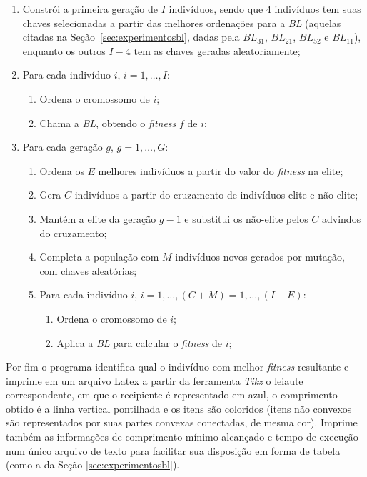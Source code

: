 \documentclass[12pt, openright, twoside, a4paper, english, brazilian]{USPSC-classe/USPSC}
\begin{document}
\begin{enumerate}
    \item Constrói a primeira geração de $I$ indivíduos, sendo que $4$ indivíduos tem suas chaves selecionadas a partir das melhores ordenações para a {\it BL} (aquelas citadas na Seção~\ref{sec:experimentosbl}, dadas pela $BL_{31}$, $BL_{21}$, $BL_{52}$ e $BL_{11}$), enquanto os outros $I-4$ tem as chaves geradas aleatoriamente;
    \item Para cada indivíduo $i$, $i = 1, \dots, I$:
    \begin{enumerate}
        \item Ordena o cromossomo de $i$;
        \item Chama a {\it BL}, obtendo o {\it fitness} $f$ de $i$;
    \end{enumerate}
    \item Para cada geração $g$, $g = 1, \dots, G$:
    \begin{enumerate}
        \item Ordena os $E$ melhores indivíduos a partir do valor do {\it fitness} na elite;
        \item Gera $C$ indivíduos a partir do cruzamento de indivíduos elite e não-elite;
        \item Mantém a elite da geração $g-1$ e substitui os não-elite pelos $C$ advindos do cruzamento;
        \item Completa a população com $M$ indivíduos novos gerados por mutação, com chaves aleatórias;
        \item Para cada indivíduo $i$, $i = 1, \dots, (C+M) = 1, \dots, (I-E)$:
        \begin{enumerate}
            \item Ordena o cromossomo de $i$;
            \item Aplica a {\it BL} para calcular o {\it fitness} de $i$;
        \end{enumerate}
    \end{enumerate}
\end{enumerate}

Por fim o programa identifica qual o indivíduo com melhor {\it fitness} resultante e imprime em um arquivo Latex a partir da ferramenta {\it Tikz} o leiaute correspondente, em que o recipiente é representado em azul, o comprimento obtido é a linha vertical pontilhada e os itens são coloridos (itens não convexos são representados por suas partes convexas conectadas, de mesma cor). Imprime também as informações de comprimento mínimo alcançado e tempo de execução num único arquivo de texto para facilitar sua disposição em forma de tabela (como a da Seção \ref{sec:experimentosbl}).
\end{document}
